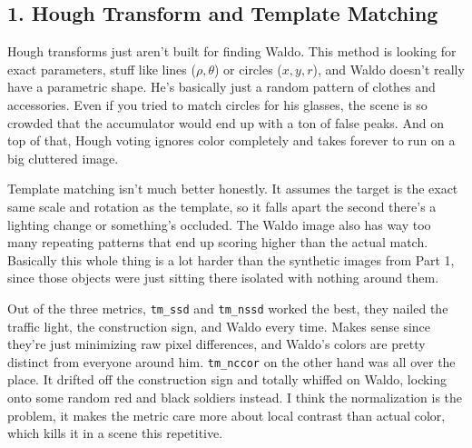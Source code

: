 \subsection*{1. Hough Transform and Template Matching}

Hough transforms just aren't built for finding Waldo. This method is looking for exact parameters, stuff like lines ($\rho, \theta$) or circles ($x, y, r$), and Waldo doesn't really have a parametric shape. He's basically just a random pattern of clothes and accessories. Even if you tried to match circles for his glasses, the scene is so crowded that the accumulator would end up with a ton of false peaks. And on top of that, Hough voting ignores color completely and takes forever to run on a big cluttered image.

Template matching isn't much better honestly. It assumes the target is the exact same scale and rotation as the template, so it falls apart the second there's a lighting change or something's occluded. The Waldo image also has way too many repeating patterns that end up scoring higher than the actual match. Basically this whole thing is a lot harder than the synthetic images from Part 1, since those objects were just sitting there isolated with nothing around them.

Out of the three metrics, \texttt{tm\_ssd} and \texttt{tm\_nssd} worked the best, they nailed the traffic light, the construction sign, and Waldo every time. Makes sense since they're just minimizing raw pixel differences, and Waldo's colors are pretty distinct from everyone around him. \texttt{tm\_nccor} on the other hand was all over the place. It drifted off the construction sign and totally whiffed on Waldo, locking onto some random red and black soldiers instead. I think the normalization is the problem, it makes the metric care more about local contrast than actual color, which kills it in a scene this repetitive.
